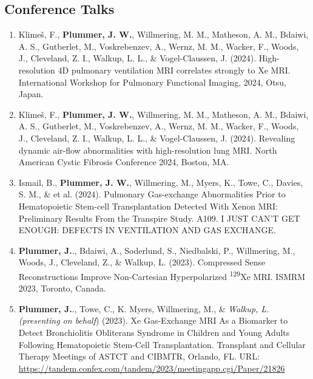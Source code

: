 \documentclass[12pt,]{scrartcl}
\begin{document}
\subsection{Conference Talks}\label{conferences_presentations}

\begin{enumerate}
  \leftskip-0.13in %


  \item Klimeš, F., \textbf{Plummer, J. W.}, Willmering, M. M., Matheson, A. M., Bdaiwi, A. S., Gutberlet, M., Voskrebenzev, A., Wernz, M. M., Wacker, F., Woods, J., Cleveland, Z. I., Walkup, L. L., \& Vogel-Claussen, J. (2024). High-resolution 4D pulmonary ventilation MRI correlates strongly to Xe MRI. International Workshop for Pulmonary Functional Imaging, 2024, Otsu, Japan.

  \item Klimeš, F., \textbf{Plummer, J. W.}, Willmering, M. M., Matheson, A. M., Bdaiwi, A. S., Gutberlet, M., Voskrebenzev, A., Wernz, M. M., Wacker, F., Woods, J., Cleveland, Z. I., Walkup, L. L., \& Vogel-Claussen, J. (2024). Revealing dynamic air-flow abnormalities with high-resolution lung MRI. North American Cystic Fibrosis Conference 2024, Boston, MA. 
  
  \item Ismail, B., \textbf{Plummer, J. W.}, Willmering, M., Myers, K., Towe, C., Davies, S. M., \& et al. (2024). Pulmonary Gas-exchange Abnormalities Prior to Hematopoietic Stem-cell Transplantation Detected With Xenon MRI: Preliminary Results From the Transpire Study. A109. I JUST CAN'T GET ENOUGH: DEFECTS IN VENTILATION AND GAS EXCHANGE.
  
  \item \textbf{Plummer, J.}., Bdaiwi, A., Soderlund, S., Niedbalski, P., Willmering, M., Woods, J., Cleveland, Z., \& Walkup, L. (2023). Compressed Sense Reconstructions Improve Non-Cartesian Hyperpolarized \textsuperscript{129}Xe MRI. ISMRM 2023, Toronto, Canada.
  
  \item \textbf{Plummer, J.}., Towe, C., K. Myers, Willmering, M., \&  \textit{Walkup, L. (presenting on behalf}) (2023). Xe Gas-Exchange MRI As a Biomarker to Detect Bronchiolitis Obliterans Syndrome in Children and Young Adults Following Hematopoietic Stem-Cell Transplantation. Transplant and Cellular Therapy Meetings of ASTCT and CIBMTR, Orlando, FL. URL: \href{https://tandem.confex.com/tandem/2023/meetingapp.cgi/Paper/21826}{https://tandem.confex.com/tandem/2023/meetingapp.cgi/Paper/21826}
  

\end{enumerate}
\end{document}
